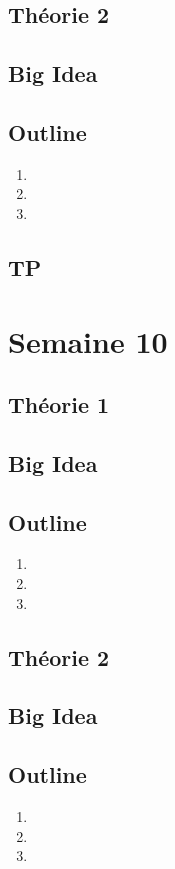 \documentclass{article}
\begin{document}
\subsection{Théorie 2}
\subsection*{Big Idea}
\subsection*{Outline}
    \begin{enumerate}
    \item
    \item
    \item
    \end{enumerate}
\subsection{TP}

\pagebreak
\section{Semaine 10}
\subsection{Théorie 1}
\subsection*{Big Idea}
\subsection*{Outline}
    \begin{enumerate}
    \item
    \item
    \item
    \end{enumerate}
\subsection{Théorie 2}
\subsection*{Big Idea}
\subsection*{Outline}
    \begin{enumerate}
    \item
    \item
    \item
    \end{enumerate}
\end{document}
